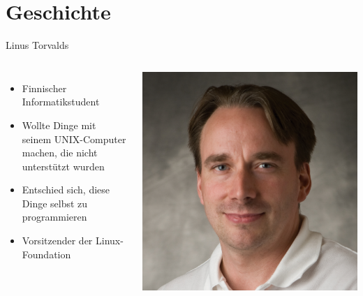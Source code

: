 \documentclass[10pt]{beamer}
\begin{document}
\section{Geschichte}
\begin{frame}{Linus Torvalds}
	\begin{columns}
		 	\begin{itemize}[<+- | alert@+>]
		 		\item Finnischer Informatikstudent
		 		\item Wollte Dinge mit seinem UNIX-Computer machen, die nicht unterstützt wurden
		 		\item Entschied sich, diese Dinge selbst zu programmieren
		 		\item Vorsitzender der Linux-Foundation
		 	\end{itemize}
	 		\includegraphics[scale=0.25]{img/torvalds.png}
	\end{columns}
\end{frame}
\end{document}
